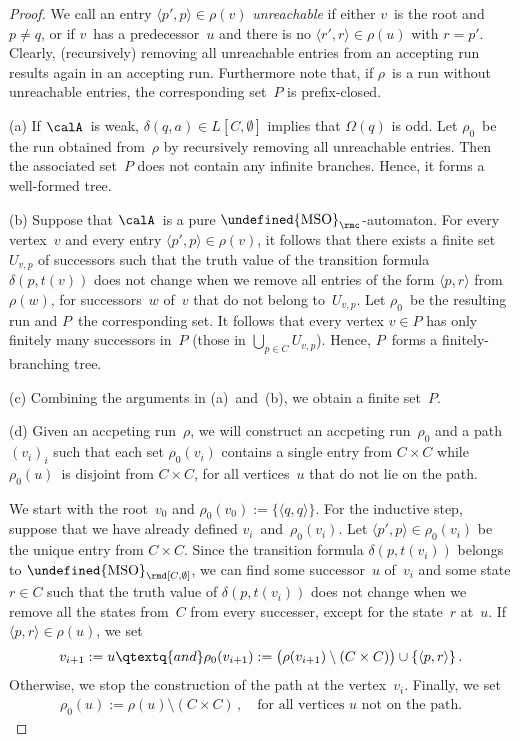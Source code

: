 \documentclass[10pt, fleqn]{scrartcl}
\makeatletter
\newcommand\m@thsm@ller[2]{\mbox{\relscale{0.91}$\m@th#1#2$}}
\let\smaller\undefined
\DeclareRobustCommand\smaller[1]{\relax\ifmmode{\mathpalette\m@thsm@ller{#1}}\else{\relscale{0.91}#1}\fi}
\newcommand*{\MSO}{\smaller{\mathrm{MSO}}}
\newcommand*{\?}{\kern .08em}
\makeatother
\begin{document}
\begin{proof}
We call an entry $\langle p',p\rangle \in \rho(v)$ \emph{unreachable} if
either $v$~is the root and $p \neq q$, or if $v$~has a predecessor~$u$
and there is no $\langle r',r\rangle \in \rho(u)$ with $r = p'$.
Clearly, (recursively) removing all unreachable entries from an accepting run results
again in an accepting run.
Furthermore note that, if $\rho$~is a run without unreachable entries, the corresponding
set~$P$ is prefix-closed.

(a) If $\calA$~is weak, $\delta(q,a) \in L[C,\emptyset]$ implies that $\Omega(q)$ is odd.
Let $\rho_0$~be the run obtained from~$\rho$ by recursively removing all unreachable
entries. Then the associated set~$P$ does not contain any infinite branches.
Hence, it forms a well-formed tree.

(b) Suppose that $\calA$~is a pure $\MSO_\rmc$-automaton.
For every vertex~$v$ and every entry $\langle p',p\rangle \in \rho(v)$,
it follows that there exists a finite set~$U_{v,p}$ of successors such that
the truth value of the transition formula $\delta(p,t(v))$ does not change
when we remove all entries of the form $\langle p,r\rangle$ from $\rho(w)$,
for successors~$w$ of~$v$ that do not belong to~$U_{v,p}$.
Let $\rho_0$~be the resulting run and $P$~the corresponding set.
It follows that every vertex $v \in P$ has only finitely many successors in~$P$
(those in $\bigcup_{p \in C} U_{v,p}$).
Hence, $P$~forms a finitely-branching tree.

(c) Combining the arguments in (a)~and~(b), we obtain a finite set~$P$.

(d) Given an accpeting run~$\rho$, we will construct an accpeting run~$\rho_0$
and a path $(v_i)_i$ such that each set $\rho_0(v_i)$ contains a single
entry from $C \times C$ while $\rho_0(u)$~is disjoint from $C \times C$,
for all vertices~$u$ that do not lie on the path.

We start with the root~$v_0$ and $\rho_0(v_0) := \{\langle q,q\rangle\}$.
For the inductive step, suppose that we have already defined
$v_i$~and~$\rho_0(v_i)$. Let $\langle p',p\rangle \in \rho_0(v_i)$ be the
unique entry from $C \times C$.
Since the transition formula $\delta(p,t(v_i))$ belongs to $\MSO_\rmd[C,\emptyset]$,
we can find some successor~$u$ of~$v_i$ and some state $r \in C$ such that
the truth value of $\delta(p,t(v_i))$ does not change when we remove all the states from~$C$
from every successer, except for the state~$r$ at~$u$.
If $\langle p,r\rangle \in \rho(u)$, we set
\begin{align*}
  v_{i+1} := u
  \qtextq{and}
  \rho_0(v_{i+1}) :=
    \bigl(\rho(v_{i+1}) \setminus (C \times C)\bigr) \cup \{\langle p,r\rangle\}\,.
\end{align*}
Otherwise, we stop the construction of the path at the vertex~$v_i$.
Finally, we set
\begin{align*}
  \rho_0(u) := \rho(u) \setminus (C \times C)\,,
  \quad\text{for all vertices~$u$ not on the path.}
\end{align*}


\end{proof}
\end{document}
